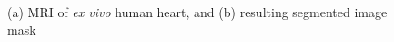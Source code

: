\begin{figure}[ht]
\centering
{}
%
\caption{(a) MRI of \textit{ex vivo} human heart, and (b) resulting segmented image mask}
\label{fig:seg}
\end{figure}

